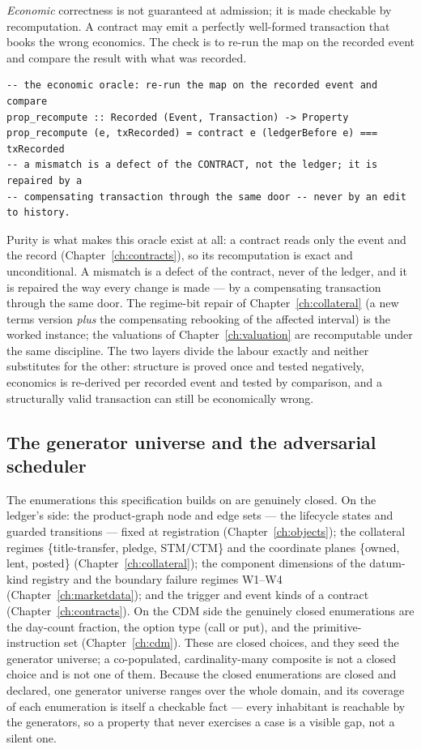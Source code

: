 \emph{Economic} correctness is not guaranteed at admission; it is made checkable by
recomputation. A contract may emit a perfectly well-formed transaction that books the wrong
economics. The check is to re-run the map on the recorded event and compare the result with
what was recorded.

\begin{lstlisting}
-- the economic oracle: re-run the map on the recorded event and compare
prop_recompute :: Recorded (Event, Transaction) -> Property
prop_recompute (e, txRecorded) = contract e (ledgerBefore e) === txRecorded
-- a mismatch is a defect of the CONTRACT, not the ledger; it is repaired by a
-- compensating transaction through the same door -- never by an edit to history.
\end{lstlisting}

Purity is what makes this oracle exist at all: a contract reads only the event and the
record (Chapter~\ref{ch:contracts}), so its recomputation is exact and unconditional. A
mismatch is a defect of the contract, never of the ledger, and it is repaired the way every
change is made --- by a compensating transaction through the same door. The regime-bit
repair of Chapter~\ref{ch:collateral} (a new terms version \emph{plus} the compensating
rebooking of the affected interval) is the worked instance; the valuations of
Chapter~\ref{ch:valuation} are recomputable under the same discipline. The two layers
divide the labour exactly and neither substitutes for the other: structure is proved once
and tested negatively, economics is re-derived per recorded event and tested by comparison,
and a structurally valid transaction can still be economically wrong.

\subsection{The generator universe and the adversarial scheduler}

The enumerations this specification builds on are genuinely closed. On the ledger's side:
the product-graph node and edge sets --- the lifecycle states and guarded transitions ---
fixed at registration (Chapter~\ref{ch:objects}); the collateral regimes
\{title-transfer, pledge, STM/CTM\} and the coordinate planes \{owned, lent, posted\}
(Chapter~\ref{ch:collateral}); the component dimensions of the datum-kind registry and the
boundary failure regimes W1--W4 (Chapter~\ref{ch:marketdata}); and the trigger and event
kinds of a contract (Chapter~\ref{ch:contracts}). On the CDM side the genuinely closed
enumerations are the day-count fraction, the option type (call or put), and the
primitive-instruction set (Chapter~\ref{ch:cdm}). These are closed choices, and they seed
the generator universe; a co-populated, cardinality-many composite is not a closed choice
and is not one of them. Because the closed enumerations are closed and declared, one
generator universe ranges over the whole domain, and its coverage of each enumeration is
itself a checkable fact --- every inhabitant is reachable by the generators, so a property
that never exercises a case is a visible gap, not a silent one.

